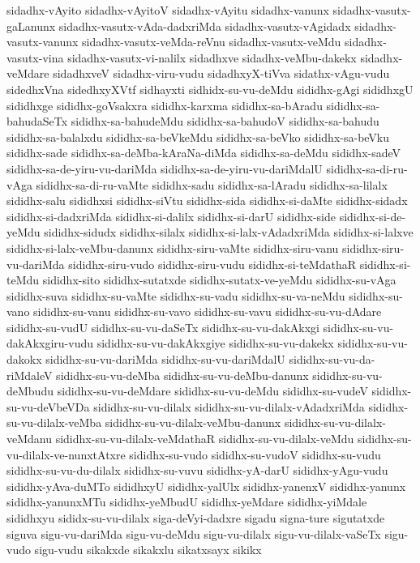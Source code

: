 {sidadhx-vAyito
sidadhx-vAyitoV
sidadhx-vAyitu
sidadhx-vanunx
sidadhx-vasutx-gaLanunx
sidadhx-vasutx-vAda-dadxriMda
sidadhx-vasutx-vAgidadx
sidadhx-vasutx-vanunx
sidadhx-vasutx-veMda-reVnu
sidadhx-vasutx-veMdu
sidadhx-vasutx-vina
sidadhx-vasutx-vi-nalilx
sidadhxve
sidadhx-veMbu-dakekx
sidadhx-veMdare
sidadhxveV
sidadhx-viru-vudu
sidadhxyX-tiVva
sidathx-vAgu-vudu
sidedhxVna
sidedhxyXVtf
sidhayxti
sidhidx-su-vu-deMdu
sididhx-gAgi
sididhxgU
sididhxge
sididhx-goVsakxra
sididhx-karxma
sididhx-sa-bAradu
sididhx-sa-bahudaSeTx
sididhx-sa-bahudeMdu
sididhx-sa-bahudoV
sididhx-sa-bahudu
sididhx-sa-balalxdu
sididhx-sa-beVkeMdu
sididhx-sa-beVko
sididhx-sa-beVku
sididhx-sade
sididhx-sa-deMba-kAraNa-diMda
sididhx-sa-deMdu
sididhx-sadeV
sididhx-sa-de-yiru-vu-dariMda
sididhx-sa-de-yiru-vu-dariMdalU
sididhx-sa-di-ru-vAga
sididhx-sa-di-ru-vaMte
sididhx-sadu
sididhx-sa-lAradu
sididhx-sa-lilalx
sididhx-salu
sididhxsi
sididhx-siVtu
sididhx-sida
sididhx-si-daMte
sididhx-sidadx
sididhx-si-dadxriMda
sididhx-si-dalilx
sididhx-si-darU
sididhx-side
sididhx-si-de-yeMdu
sididhx-sidudx
sididhx-silalx
sididhx-si-lalx-vAdadxriMda
sididhx-si-lalxve
sididhx-si-lalx-veMbu-danunx
sididhx-siru-vaMte
sididhx-siru-vanu
sididhx-siru-vu-dariMda
sididhx-siru-vudo
sididhx-siru-vudu
sididhx-si-teMdathaR
sididhx-si-teMdu
sididhx-sito
sididhx-sutatxde
sididhx-sutatx-ve-yeMdu
sididhx-su-vAga
sididhx-suva
sididhx-su-vaMte
sididhx-su-vadu
sididhx-su-va-neMdu
sididhx-su-vano
sididhx-su-vanu
sididhx-su-vavo
sididhx-su-vavu
sididhx-su-vu-dAdare
sididhx-su-vudU
sididhx-su-vu-daSeTx
sididhx-su-vu-dakAkxgi
sididhx-su-vu-dakAkxgiru-vudu
sididhx-su-vu-dakAkxgiye
sididhx-su-vu-dakekx
sididhx-su-vu-dakokx
sididhx-su-vu-dariMda
sididhx-su-vu-dariMdalU
sididhx-su-vu-da-riMdaleV
sididhx-su-vu-deMba
sididhx-su-vu-deMbu-danunx
sididhx-su-vu-deMbudu
sididhx-su-vu-deMdare
sididhx-su-vu-deMdu
sididhx-su-vudeV
sididhx-su-vu-deVbeVDa
sididhx-su-vu-dilalx
sididhx-su-vu-dilalx-vAdadxriMda
sididhx-su-vu-dilalx-veMba
sididhx-su-vu-dilalx-veMbu-danunx
sididhx-su-vu-dilalx-veMdanu
sididhx-su-vu-dilalx-veMdathaR
sididhx-su-vu-dilalx-veMdu
sididhx-su-vu-dilalx-ve-nunxtAtxre
sididhx-su-vudo
sididhx-su-vudoV
sididhx-su-vudu
sididhx-su-vu-du-dilalx
sididhx-su-vuvu
sididhx-yA-darU
sididhx-yAgu-vudu
sididhx-yAva-duMTo
sididhxyU
sididhx-yalUlx
sididhx-yanenxV
sididhx-yanunx
sididhx-yanunxMTu
sididhx-yeMbudU
sididhx-yeMdare
sididhx-yiMdale
sididhxyu
sididx-su-vu-dilalx
siga-deVyi-dadxre
sigadu
signa-ture
sigutatxde
siguva
sigu-vu-dariMda
sigu-vu-deMdu
sigu-vu-dilalx
sigu-vu-dilalx-vaSeTx
sigu-vudo
sigu-vudu
sikakxde
sikakxlu
sikatxsayx
sikikx
}

